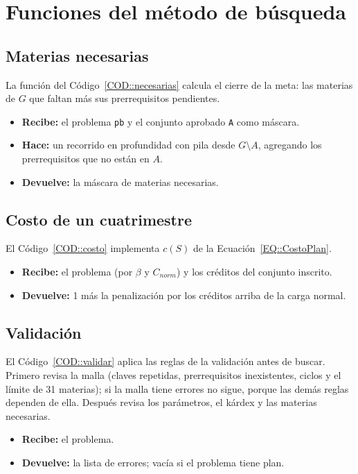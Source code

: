 \section{Funciones del método de búsqueda}

\subsection{Materias necesarias}
La función del Código~\ref{COD::necesarias} calcula el cierre de la meta: las materias de $G$ que faltan más sus prerrequisitos pendientes.
\begin{itemize}
    \item \textbf{Recibe:} el problema \texttt{pb} y el conjunto aprobado \texttt{A} como máscara.
    \item \textbf{Hace:} un recorrido en profundidad con pila desde $G \setminus A$, agregando los prerrequisitos que no están en $A$.
    \item \textbf{Devuelve:} la máscara de materias necesarias.
\end{itemize}


\subsection{Costo de un cuatrimestre}
El Código~\ref{COD::costo} implementa $c(S)$ de la Ecuación~\eqref{EQ::CostoPlan}.
\begin{itemize}
    \item \textbf{Recibe:} el problema (por $\beta$ y $C_{norm}$) y los créditos del conjunto inscrito.
    \item \textbf{Devuelve:} 1 más la penalización por los créditos arriba de la carga normal.
\end{itemize}


\subsection{Validación}
El Código~\ref{COD::validar} aplica las reglas de la validación antes de buscar. Primero revisa la malla (claves repetidas, prerrequisitos inexistentes, ciclos y el límite de 31 materias); si la malla tiene errores no sigue, porque las demás reglas dependen de ella. Después revisa los parámetros, el kárdex y las materias necesarias.
\begin{itemize}
    \item \textbf{Recibe:} el problema.
    \item \textbf{Devuelve:} la lista de errores; vacía si el problema tiene plan.
\end{itemize}


